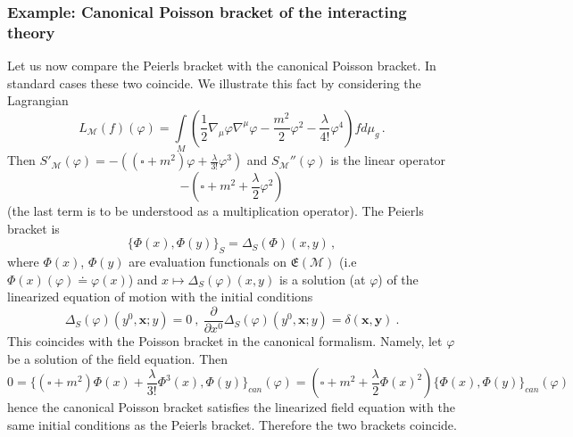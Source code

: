 \documentclass[11pt]{article}
\newcommand{\E}{\mathfrak{E}}
\newcommand{\Mcal}{\mathcal{M}}
\newcommand{\la}{\lambda}
\newcommand{\ph}{\varphi}
\newcommand{\Poi}[2]{\{#1,#2\}}
\newcommand{\1}{\mathds{1}}                         %
\newcommand{\pa}{\partial}                              %
\newcommand{\be}{\begin{equation}}
\newcommand{\ee}{\end{equation}}
\begin{document}
{\subsubsection{Example: Canonical Poisson bracket of the interacting theory}
Let us now compare the Peierls bracket with the canonical Poisson bracket. In standard cases these two coincide. We illustrate this fact by considering the Lagrangian
\[
L_\Mcal(f)(\ph)=\int\limits_M \left(\frac{1}{2}\nabla_\mu\ph\nabla^\mu\ph-\frac{m^2}{2}\ph^2-\frac{\la}{4!}\ph^4\right)fd\mu_g\,.
\]
Then $S'_\Mcal(\ph)=-\left((\square+m^2)\ph+\frac{\lambda}{3!}\ph^3\right)$ and $S_\Mcal''(\ph)$ is the linear operator
\be
-\left(\square +m^2+\frac{\lambda}{2}\ph^2\right)
\ee
(the last term is to be understood as a multiplication operator). The Peierls bracket is
\be
\Poi{\Phi(x)}{\Phi(y)}_S=\Delta_S(\Phi)(x,y)\,,
\ee
where $\Phi(x)$, $\Phi(y)$ are evaluation functionals on $\E(\Mcal)$ (i.e $\Phi(x)(\ph)\doteq \ph(x)$)
and   $x\mapsto \Delta_S(\ph)(x,y)$ is a solution (at $\ph$) of the  linearized equation of motion with the initial conditions
\be
\Delta_S(\ph)(y^0,\mathbf{x};y)=0\ ,\ \frac{\pa}{\pa x^0}\Delta_S(\ph)(y^0,\mathbf{x};y)=\delta(\mathbf{x},\mathbf{y})\ .
\ee
This coincides with the Poisson bracket in the canonical formalism. Namely, let $\ph$ be a solution of the field equation.
Then
\be
0=\Big\{(\square +m^2)\Phi(x)+\frac{\lambda}{3!}\Phi^3(x),\Phi(y)\Big\}_
{can}(\ph)=(\square +m^2+\frac{\lambda}{2}\Phi(x)^2)\Big\{\Phi(x),\Phi(y)\Big\}_{can}(\ph)
\ee
hence the canonical Poisson bracket satisfies the linearized field equation with the same initial conditions as the Peierls bracket.  Therefore the two brackets coincide.
}
\end{document}
